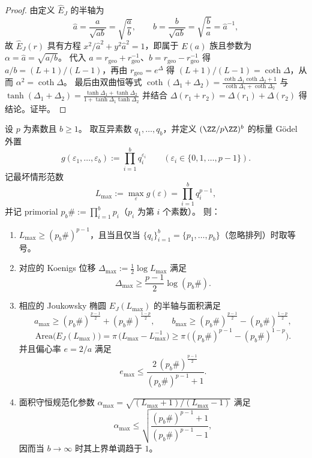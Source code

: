 \begin{proof}
由定义 \(\widehat E_J\) 的半轴为
\[
\hat a=\frac{a}{\sqrt{ab}}=\sqrt{\frac{a}{b}},\qquad
\hat b=\frac{b}{\sqrt{ab}}=\sqrt{\frac{b}{a}}=\hat a^{-1},
\]
故 \(\widehat E_J(r)\) 具有方程 \(x^2/\hat a^2+y^2\hat a^2=1\)，即属于 \(E(a)\) 族且参数为 \(\alpha=\hat a=\sqrt{a/b}\)。
代入 \(a=r_{\mathrm{geo}}+r_{\mathrm{geo}}^{-1}\)、\(b=r_{\mathrm{geo}}-r_{\mathrm{geo}}^{-1}\) 得
\(
a/b=(L+1)/(L-1)
\)，再由 \(r_{\mathrm{geo}}=e^{\Delta}\) 得 \((L+1)/(L-1)=\coth\Delta\)，从而 \(\alpha^2=\coth\Delta\)。
最后由双曲恒等式
\(
\coth(\Delta_1+\Delta_2)=\frac{\coth\Delta_1\coth\Delta_2+1}{\coth\Delta_1+\coth\Delta_2}
\)
与
\(
\tanh(\Delta_1+\Delta_2)=\frac{\tanh\Delta_1+\tanh\Delta_2}{1+\tanh\Delta_1\tanh\Delta_2}
\)
并结合 \(\Delta(r_1+r_2)=\Delta(r_1)+\Delta(r_2)\) 得结论。证毕。
\end{proof}

\begin{proposition}\label{prop:group-jg-boundary-primorial-ellipse-bound}
设 \(p\) 为素数且 \(b\ge 1\)。
取互异素数 \(q_1,\dots,q_b\)，并定义 \((\ZZ/p\ZZ)^b\) 的标量 Gödel 外置
\[
g(\varepsilon_1,\dots,\varepsilon_b):=\prod_{i=1}^b q_i^{\varepsilon_i}\qquad(\varepsilon_i\in\{0,1,\dots,p-1\}).
\]
记最坏情形范数
\[
L_{\max}:=\max_{\varepsilon} g(\varepsilon)=\prod_{i=1}^b q_i^{p-1},
\]
并记 primorial \(p_b\#:=\prod_{i=1}^b p_i\)（\(p_i\) 为第 \(i\) 个素数）。
则：
\begin{enumerate}
  \item \(L_{\max}\ge (p_b\#)^{p-1}\)，且当且仅当 \(\{q_i\}_{i=1}^b=\{p_1,\dots,p_b\}\)（忽略排列）时取等号。
  \item 对应的 Koenigs 位移 \(\Delta_{\max}:=\frac12\log L_{\max}\) 满足
  \[
  \Delta_{\max}\ge \frac{p-1}{2}\log(p_b\#).
  \]
  \item 相应的 Joukowsky 椭圆 \(E_J(L_{\max})\) 的半轴与面积满足
  \[
  a_{\max}\ge (p_b\#)^{\frac{p-1}{2}}+(p_b\#)^{\frac{1-p}{2}},\qquad
  b_{\max}\ge (p_b\#)^{\frac{p-1}{2}}-(p_b\#)^{\frac{1-p}{2}},
  \]
  \[
  \mathrm{Area}\bigl(E_J(L_{\max})\bigr)=\pi\,\bigl(L_{\max}-L_{\max}^{-1}\bigr)\ge \pi\,\bigl((p_b\#)^{p-1}-(p_b\#)^{1-p}\bigr).
  \]
  并且偏心率 \(e=2/a\) 满足
  \[
  e_{\max}\le \frac{2\,(p_b\#)^{\frac{p-1}{2}}}{(p_b\#)^{p-1}+1}.
  \]
  \item 面积守恒规范化参数 \(\alpha_{\max}=\sqrt{(L_{\max}+1)/(L_{\max}-1)}\) 满足
  \[
  \alpha_{\max}\le \sqrt{\frac{(p_b\#)^{p-1}+1}{(p_b\#)^{p-1}-1}},
  \]
  因而当 \(b\to\infty\) 时其上界单调趋于 \(1\)。
\end{enumerate}
\end{proposition}

